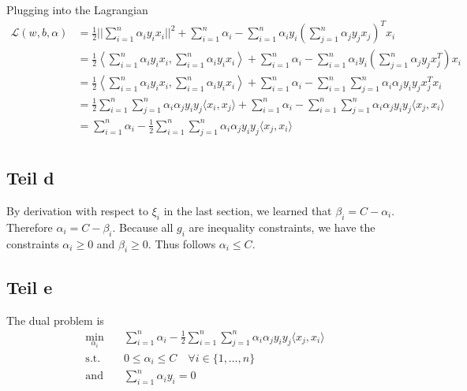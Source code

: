 \documentclass[10pt,a4paper]{article}
\begin{document}
Plugging into the Lagrangian
\begin{align*}
  \mathcal{L}(w, b, \alpha) & = \frac{1}{2} ||\sum_{i = 1}^{n} \alpha_{i}y_{i}x_{i}||^{2} + \sum_{i = 1}^{n} \alpha_{i} - \sum_{i = 1}^{n} \alpha_{i} y_{i}\left( \sum_{j = 1}^{n} \alpha_{j}y_{j}x_{j} \right)^{T}x_{i}\\
                            & = \frac{1}{2} \left\langle \sum_{i = 1}^{n} \alpha_{i}y_{i}x_{i}, \sum_{i = 1}^{n} \alpha_{i}y_{i}x_{i} \right\rangle + \sum_{i = 1}^{n} \alpha_{i} - \sum_{i = 1}^{n} \alpha_{i} y_{i}\left( \sum_{j = 1}^{n} \alpha_{j}y_{j}x_{j}^{T} \right)x_{i}\\
                            & = \frac{1}{2} \left\langle \sum_{i = 1}^{n} \alpha_{i}y_{i}x_{i}, \sum_{i = 1}^{n} \alpha_{i}y_{i}x_{i} \right\rangle + \sum_{i = 1}^{n} \alpha_{i} - \sum_{i = 1}^{n} \sum_{j = 1}^{n} \alpha_{i}\alpha_{j}y_{i}y_{j}x_{j}^{T}x_{i}\\
                            & = \frac{1}{2} \sum_{i = 1}^{n} \sum_{j = 1}^{n} \alpha_{i}\alpha_{j}y_{i}y_{j} \langle x_{i}, x_{j} \rangle + \sum_{i = 1}^{n} \alpha_{i} - \sum_{i = 1}^{n} \sum_{j = 1}^{n} \alpha_{i}\alpha_{j}y_{i}y_{j}\langle x_{j}, x_{i} \rangle\\
                            & = \sum_{i = 1}^{n} \alpha_{i} - \frac{1}{2} \sum_{i = 1}^{n} \sum_{j = 1}^{n} \alpha_{i}\alpha_{j}y_{i}y_{j}\langle x_{j}, x_{i} \rangle\\
\end{align*}

\subsection{Teil d}

By derivation with respect to $\xi_{i}$ in the last section, we learned that
$\beta_{i} = C - \alpha_{i}$. Therefore $\alpha_{i} = C - \beta_{i}$. Because
all $g_{i}$ are inequality constraints, we have the constraints
$\alpha_{i} \ge 0$ and $\beta_{i} \ge 0$. Thus follows $\alpha_{i} \le C$.

\subsection{Teil e}

The dual problem is
\begin{align*}
  \min_{\alpha_{i}} & \quad \sum_{i = 1}^{n} \alpha_{i} - \frac{1}{2} \sum_{i = 1}^{n} \sum_{j = 1}^{n} \alpha_{i}\alpha_{j}y_{i}y_{j}\langle x_{j}, x_{i} \rangle\\
  \text{s.t.} & \quad 0 \le \alpha_{i} \le C \quad \forall i \in \{ 1, \dots, n \}\\
  \text{and} & \quad \sum_{i = 1}^{n} \alpha_{i}y_{i} = 0
\end{align*}
\end{document}
